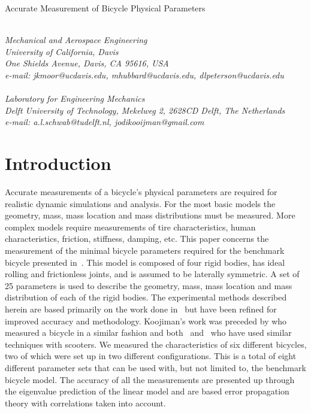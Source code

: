 \documentclass{bmd2010a}
\begin{document}
\begin{flushleft}
{\fontsize{16pt}{20pt}\selectfont%
  Accurate Measurement of Bicycle Physical Parameters\\}
\end{flushleft}

\begin{flushleft}
  {\\}
  \textit{Mechanical and Aerospace Engineering\\
          University of California, Davis\\
          One Shields Avenue, Davis, CA 95616, USA\\
          e-mail: jkmoor@ucdavis.edu, mhubbard@ucdavis.edu,
          dlpeterson@ucdavis.edu
  }\vspace{10pt}\\
  {\\}
  \textit{Laboratory for Engineering Mechanics\\
          Delft University of Technology, Mekelweg 2, 2628CD Delft, The
          Netherlands\\
          e-mail: a.l.schwab@tudelft.nl, jodikooijman@gmail.com
  }\vspace{10pt}\\
\end{flushleft}

\section*{Introduction}
Accurate measurements of a bicycle's physical parameters are required for
realistic dynamic simulations and analysis. For the most basic models the
geometry, mass, mass location and mass distributions must be measured. More complex models
require measurements of tire characteristics, human characteristics, friction, stiffness, damping, etc. This
paper concerns the measurement of the minimal bicycle parameters required for
the benchmark bicycle presented in~\cite{Meijaard2007}. This
model is composed of four rigid bodies, has ideal rolling and frictionless joints,
and is assumed to be laterally symmetric. A set of 25
parameters is used to describe the geometry, mass, mass location and
mass distribution of each of the rigid bodies. The experimental methods
described herein are based primarily on the work
done in~\cite{Kooijman2006} but have been refined for improved accuracy and
methodology. Koojiman's work was preceded by \cite{Roland1971} who measured a bicycle in a
similar fashion and both~\cite{Dohring1953} and~\cite{Singh1971} who have used
similar techniques with scooters. We measured the characteristics of six
different bicycles, two of which were set up in two different configurations.
This is a total of eight different parameter sets that can be used with, but not
limited to, the benchmark bicycle model. The accuracy of all the measurements
are presented up through the eigenvalue prediction of the linear model and are
based error propagation theory with correlations taken into account.
\end{document}
